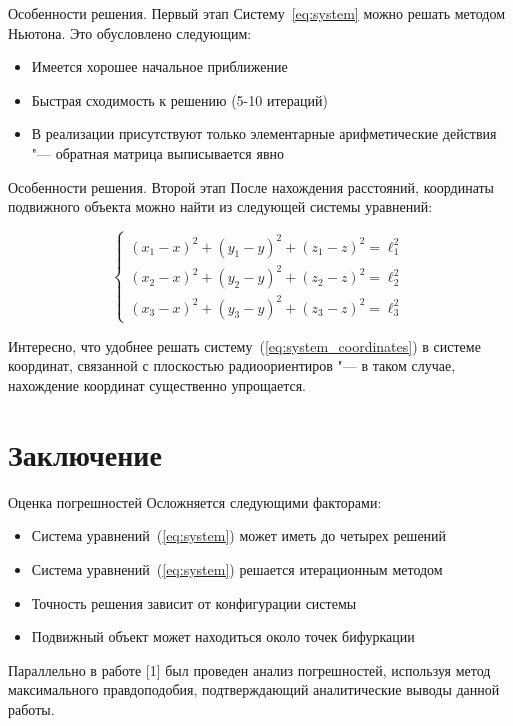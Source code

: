 \documentclass[russian,hyperref={unicode}]{beamer}
\begin{document}
  \begin{frame}{Особенности решения. Первый этап}
    Систему~\ref{eq:system} можно решать методом Ньютона. Это обусловлено следующим:
    \begin{itemize}
      \item Имеется хорошее начальное приближение
      \item Быстрая сходимость к решению (5-10 итераций)
      \item В реализации присутствуют только элементарные арифметические действия "--- обратная
            матрица выписывается явно
    \end{itemize}
  \end{frame}

  \begin{frame}{Особенности решения. Второй этап}
    После нахождения расстояний, координаты подвижного объекта можно найти из следующей
    системы уравнений:

    \begin{equation}\label{eq:system_coordinates}
      \begin{cases}
        \left(x_1 - x\right)^2 + \left(y_1 - y\right)^2 + \left(z_1 - z\right)^2 = \ell_1^2 \\
        \left(x_2 - x\right)^2 + \left(y_2 - y\right)^2 + \left(z_2 - z\right)^2 = \ell_2^2 \\
        \left(x_3 - x\right)^2 + \left(y_3 - y\right)^2 + \left(z_3 - z\right)^2 = \ell_3^2
      \end{cases}
    \end{equation}

    Интересно, что удобнее решать систему~(\ref{eq:system_coordinates}) в системе координат,
    связанной с плоскостью радиоориентиров "--- в таком случае, нахождение координат
    существенно упрощается.
  \end{frame}

  \section{Заключение}
  \begin{frame}{Оценка погрешностей}
    Осложняется следующими факторами:
    \begin{itemize}
      \item Система уравнений~(\ref{eq:system}) может иметь до четырех решений
      \item Система уравнений~(\ref{eq:system}) решается итерационным методом
      \item Точность решения зависит от конфигурации системы
      \item Подвижный объект может находиться около точек бифуркации
    \end{itemize}

    Параллельно в работе [1] был проведен анализ погрешностей, используя метод
    максимального правдоподобия, подтверждающий аналитические выводы данной работы.
  \end{frame}
\end{document}
